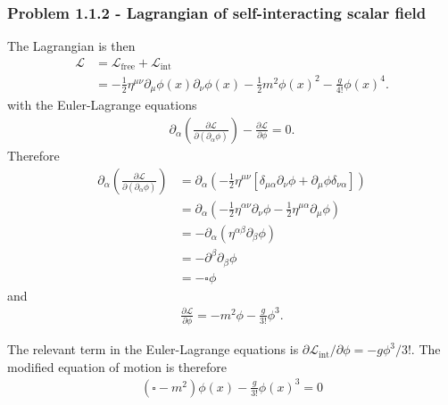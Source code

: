 \documentclass[10pt,a4paper]{article}
\theoremstyle{definition}
\begin{document}
\subsubsection{Problem 1.1.2 - Lagrangian of self-interacting scalar field}
The Lagrangian is then
\begin{align}
    \mathcal{L}&=\mathcal{L}_\text{free}+\mathcal{L}_\text{int}\\
                &=-\frac{1}{2}\eta^{\mu\nu}\partial_\mu\phi(x)\partial_\nu\phi(x)-\frac{1}{2}m^2\phi(x)^2-\frac{g}{4!}\phi(x)^4.
\end{align}
with the Euler-Lagrange equations
\begin{align}
    \partial_\alpha\left(\frac{\partial\mathcal{L}}{\partial(\partial_\alpha\phi)}\right)-\frac{\partial\mathcal{L}}{\partial\phi}=0.
\end{align}
Therefore
\begin{align}
    \partial_\alpha\left(\frac{\partial\mathcal{L}}{\partial(\partial_\alpha\phi)}\right)
    &=\partial_\alpha\left(-\frac{1}{2}\eta^{\mu\nu}[\delta_{\mu\alpha}\partial_\nu\phi+\partial_\mu\phi\delta_{\nu\alpha}]\right)\\
    &=\partial_\alpha\left(-\frac{1}{2}\eta^{\alpha\nu}\partial_\nu\phi-\frac{1}{2}\eta^{\mu\alpha}\partial_\mu\phi\right)\\
    &=-\partial_\alpha\left(\eta^{\alpha\beta}\partial_\beta\phi\right)\\
    &=-\partial^\beta\partial_\beta\phi\\
    &=-\square\phi
\end{align}
and
\begin{align}
    \frac{\partial\mathcal{L}}{\partial\phi} = -m^2\phi-\frac{g}{3!}\phi^3.
\end{align}

The relevant term in the Euler-Lagrange equations is $\partial\mathcal{L}_\text{int}/\partial\phi=-g\phi^3/3!$. The modified equation of motion is therefore
\begin{align}
    (\square - m^2)\phi(x)-\frac{g}{3!}\phi(x)^3=0
\end{align}
\end{document}
